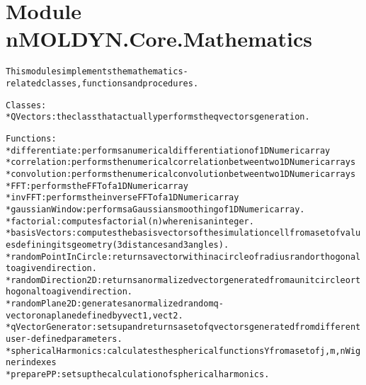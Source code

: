 %
%
%


\section{Module nMOLDYN.Core.Mathematics}

    \label{nMOLDYN:Core:Mathematics}
\begin{alltt}
This modules implements the mathematics-related classes, functions and procedures.

Classes:
    * QVectors: the class that actually performs the q vectors generation.

Functions:
    * differentiate      : performs a numerical differentiation of 1D Numeric array
    * correlation        : performs the numerical correlation between two 1D Numeric arrays
    * convolution        : performs the numerical convolution between two 1D Numeric arrays
    * FFT                : performs the FFT of a 1D Numeric array
    * invFFT             : performs the inverse FFT of a 1D Numeric array
    * gaussianWindow     : performs a Gaussian smoothing of 1D Numeric array.
    * factorial          : computes factorial (n) where n is an integer.
    * basisVectors       : computes the basis vectors of the simulation cell from a set of values defining its geometry (3 distances and 3 angles).
    * randomPointInCircle: returns a vector within a circle of radius {\textbar}r{\textbar} and orthogonal to a given direction.
    * randomDirection2D  : returns a normalized vector generated from a unit circle orthogonal to a given direction.
    * randomPlane2D      : generates a normalized random q-vector on a plane defined by vect1, vect2.
    * qVectorGenerator   : sets up and returns a set of q vectors generated from different user-defined parameters.
    * sphericalHarmonics : calculates the spherical functions Y from a set of j, m, n Wigner indexes
    * preparePP          : sets up the calculation of spherical harmonics.
\end{alltt}



